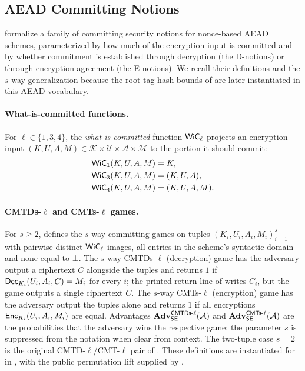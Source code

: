 \subsection{AEAD Committing Notions}
\label{sec:commit-defs}

\cite{BH22} formalize a family of committing security notions for
nonce-based AEAD schemes, parameterized by how much of the
encryption input is committed and by whether commitment is
established through decryption (the D-notions) or through encryption
agreement (the E-notions). We recall their definitions and the
$s$-way generalization because the root tag hash bounds of
 are later instantiated in this AEAD
vocabulary.

\paragraph{What-is-committed functions.}
For $\ell \in \{1, 3, 4\}$, the \emph{what-is-committed} function
$\mathsf{WiC}_\ell$ projects an encryption input $(K, U, A, M) \in \mathcal{K}
\times \mathcal{U} \times \mathcal{A} \times \mathcal{M}$ to the
portion it should commit:
\[
\begin{aligned}
  \mathsf{WiC}_1(K, U, A, M) &= K, \\
  \mathsf{WiC}_3(K, U, A, M) &= (K, U, A), \\
  \mathsf{WiC}_4(K, U, A, M) &= (K, U, A, M).
\end{aligned}
\]

\paragraph{CMTDs-$\ell$ and CMTs-$\ell$ games.}
For $s \geq 2$, \cite[Fig.~5]{BH22} defines the $s$-way committing
games on tuples $(K_i, U_i, A_i, M_i)_{i=1}^s$ with pairwise distinct
$\mathsf{WiC}_\ell$-images, all entries in the scheme's syntactic domain and
none equal to $\bot$. The $s$-way CMTDs-$\ell$ (decryption) game has
the adversary output a ciphertext $C$ alongside the tuples and returns
$1$ if $\mathsf{Dec}_{K_i}(U_i, A_i, C) = M_i$ for every $i$; the printed
return line of \cite[Fig.~5]{BH22} writes $C_i$, but the game outputs a
single ciphertext $C$. The $s$-way CMTs-$\ell$ (encryption) game has the
adversary output the tuples alone and returns $1$ if all encryptions
$\mathsf{Enc}_{K_i}(U_i, A_i, M_i)$ are equal. Advantages
$\mathbf{Adv}^{\mathsf{CMTDs}\text{-}\ell}_{\mathsf{SE}}(\mathcal{A})$ and
$\mathbf{Adv}^{\mathsf{CMTs}\text{-}\ell}_{\mathsf{SE}}(\mathcal{A})$ are the probabilities that the
adversary wins the respective game; the parameter $s$ is suppressed
from the notation when clear from context. The two-tuple case $s = 2$
is the original CMTD-$\ell$/CMT-$\ell$ pair of \cite[Fig.~4]{BH22}.
These definitions are instantiated for \TW{} in ,
with the public permutation lift supplied by .

